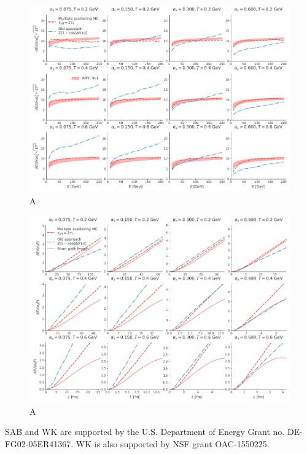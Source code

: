 \documentclass[aps, prc, reprint, amsmath, groupedaddress, nofootinbib]{revtex4-1}
\begin{document}
\begin{figure}
\includegraphics[width=\textwidth]{Eloss_infinite.pdf}
\caption{A}
\label{fig:eloss-inf}
\end{figure}

\begin{figure}
\includegraphics[width=\textwidth]{Eloss_Ldep.pdf}
\caption{A}
\label{fig:eloss-ldep}
\end{figure}

\begin{acknowledgments}
SAB and WK  are supported by the U.S. Department of Energy Grant no. DE-FG02-05ER41367. WK is also supported by NSF grant OAC-1550225.
\end{acknowledgments}

\begin{appendices}
\end{appendices}
 
\end{document}
